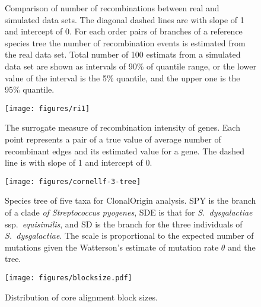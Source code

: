\documentclass[english]{article}
\begin{document}
\begin{figure}


\caption{\label{fig:h2}Comparison of number of recombinations between real
and simulated data sets. The diagonal dashed lines are with
slope of 1 and intercept of 0. For each order pairs of branches of
a reference species tree the number of recombination events is estimated
from the real data set. Total number of 100 estimats from a simulated
data set are shown as intervals of 90\% of quantile range, or the
lower value of the interval is the 5\% quantile, and the upper one
is the 95\% quantile. }
\end{figure}
\clearpage{}%


\begin{figure}
\texttt{[image: figures/ri1]}
\caption{\label{fig:ri1}The surrogate measure of recombination intensity
of genes. Each point represents a pair of a true value of average number of
recombinant edges and its estimated value for a gene. The dashed line is with
slope of 1 and intercept of 0.}
\end{figure}
\clearpage{}%



\begin{figure}
\texttt{[image: figures/cornellf-3-tree]}
\caption{\label{fig:tree5}Species tree of five taxa for ClonalOrigin analysis.
SPY is the branch of a clade\emph{ of Streptococcus pyogenes}, SDE
is that for \emph{S.\ dysgalactiae} ssp.\emph{\ equisimilis}, and SD is the
branch for the three individuals of \emph{S.\ dysgalactiae}. The scale is
proportional to the expected number of mutations given the Watterson's estimate 
of mutation
rate $\theta$ and the tree.}
\end{figure}
\clearpage{}%

\begin{figure}
\begin{center}
\texttt{[image: figures/blocksize.pdf]}
\end{center}
\vspace{-.3in}
\caption{Distribution of core alignment block sizes.}
\label{fig:blocksize}
\end{figure}
\clearpage{}%
\end{document}
